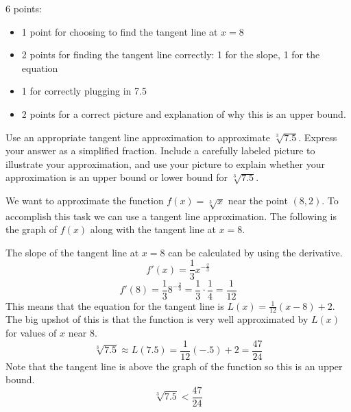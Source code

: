 \documentclass{article}
\begin{document}
\begin{enumerate}
\begin{enumerate}
    \begin{grading}
      6 points:
      \begin{itemize}[nosep]
      \item 1 point for choosing to find the tangent line at $x = 8$
      \item 2 points for finding the tangent line correctly: 1 for the slope, 1 for the equation
      \item 1 for correctly plugging in 7.5
      \item 2 points for a correct picture and explanation of why this is an upper bound. 
      \end{itemize}
    \end{grading} 

    \begin{problem}[\vfill\newpage]
      Use an appropriate tangent line approximation to approximate $\sqrt[3] {7.5}$. Express your answer as a simplified fraction. Include a carefully labeled picture to illustrate your approximation, and use your picture to explain whether your approximation is an upper bound or lower bound for $\sqrt[3]{7.5}$.
    \end{problem}

    \begin{solution}  
      We want to approximate the function $f(x) = \sqrt[3] {x}$ near the point $(8, 2)$. To accomplish this task we can use a tangent line approximation. The following is the graph of $f(x)$ along with the tangent line at $x=8$. \begin{center}  
        \end{center} 
      The slope of the tangent line at $x=8$ can be calculated by using the derivative. 
      $$ f'(x) = \frac{1}{3} x^{- \frac{ 2}{3} } $$ 
      $$f'(8) = \frac{1}{3} 8^{-\frac{2}{3}} = \frac{1}{3} \cdot \frac{1} {4} = \frac{1}{12} $$ 
      This means that the equation for the tangent line is $L(x) = \frac{1}{12} (x-8) +2$. The big upshot of this is that the function is very well approximated by $L(x)$ for values of $x$ near $8$. 
      $$\sqrt[3]{7.5} \approx L(7.5) =\frac{1}{12} (-.5)+2 = \frac{47}{24} $$
      Note that the tangent line is above the graph of the function so this is an upper bound. 
      $$ \sqrt[3]{7.5} < \frac{47}{24}$$ 
    \end{solution} 


\end{enumerate}
\end{enumerate}
\end{document}
